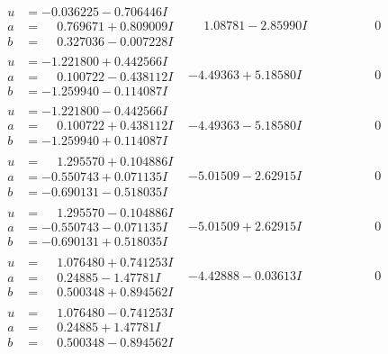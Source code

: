 \documentclass[1p]{elsarticle_modified}
\theoremstyle{definition}
\begin{document}
$$\begin{array}{c|c|c}
\begin{aligned}
u &= -0.036225 - 0.706446 I \\
a &= \phantom{-}0.769671 + 0.809009 I \\
b &= \phantom{-}0.327036 - 0.007228 I\end{aligned}
 & \phantom{-}1.08781 - 2.85990 I & \phantom{-0.000000 } 0 \\ \hline\begin{aligned}
u &= -1.221800 + 0.442566 I \\
a &= \phantom{-}0.100722 - 0.438112 I \\
b &= -1.259940 - 0.114087 I\end{aligned}
 & -4.49363 + 5.18580 I & \phantom{-0.000000 } 0 \\ \hline\begin{aligned}
u &= -1.221800 - 0.442566 I \\
a &= \phantom{-}0.100722 + 0.438112 I \\
b &= -1.259940 + 0.114087 I\end{aligned}
 & -4.49363 - 5.18580 I & \phantom{-0.000000 } 0 \\ \hline\begin{aligned}
u &= \phantom{-}1.295570 + 0.104886 I \\
a &= -0.550743 + 0.071135 I \\
b &= -0.690131 - 0.518035 I\end{aligned}
 & -5.01509 - 2.62915 I & \phantom{-0.000000 } 0 \\ \hline\begin{aligned}
u &= \phantom{-}1.295570 - 0.104886 I \\
a &= -0.550743 - 0.071135 I \\
b &= -0.690131 + 0.518035 I\end{aligned}
 & -5.01509 + 2.62915 I & \phantom{-0.000000 } 0 \\ \hline\begin{aligned}
u &= \phantom{-}1.076480 + 0.741253 I \\
a &= \phantom{-}0.24885 - 1.47781 I \\
b &= \phantom{-}0.500348 + 0.894562 I\end{aligned}
 & -4.42888 - 0.03613 I & \phantom{-0.000000 } 0 \\ \hline\begin{aligned}
u &= \phantom{-}1.076480 - 0.741253 I \\
a &= \phantom{-}0.24885 + 1.47781 I \\
b &= \phantom{-}0.500348 - 0.894562 I\end{aligned}

\end{array}$$
\end{document}
